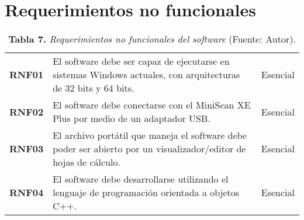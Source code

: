 \section{Requerimientos no funcionales}
\FloatBarrier
	\begin{table}[htb]
		\small
		\caption{\textbf{Tabla 7.} \textit{Requerimientos no funcionales del software} (Fuente: Autor).}
		\centering
		\setlength{\extrarowheight}{\altocelda}
		\begin{tabulary}{\anchotabla}{|c|J|c|}
			\hline
			 &  & \\ \hline
			\textbf{RNF01} & El software debe ser capaz de ejecutarse en sistemas Windows actuales, con arquitecturas de 32 bits y 64 bits. & Esencial\\ \hline
			\textbf{RNF02} & El software debe conectarse con el MiniScan XE Plus por medio de un adaptador USB. & Esencial\\ \hline
			\textbf{RNF03} & El archivo port\'{a}til que maneja el software debe poder ser abierto por un visualizador/editor de hojas de c\'{a}lculo. & Esencial\\ \hline
			\textbf{RNF04} & El software debe desarrollarse utilizando el lenguaje de programaci\'{o}n orientada a objetos C++. & Esencial\\ \hline
		\end{tabulary}
	\end{table}
\FloatBarrier %